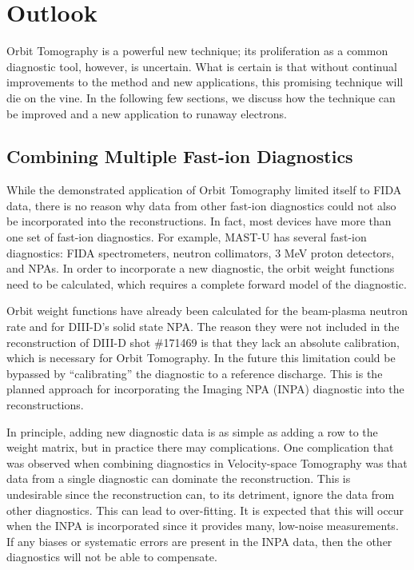 \chapter{Outlook}\label{chap:outlook}

Orbit Tomography is a powerful new technique; its proliferation as a common diagnostic tool, however, is uncertain. What is certain is that without continual improvements to the method and new applications, this promising technique will die on the vine. In the following few sections, we discuss how the technique can be improved and a new application to runaway electrons.

\section{Combining Multiple Fast-ion Diagnostics}
While the demonstrated application of Orbit Tomography limited itself to FIDA data, there is no reason why data from other fast-ion diagnostics could not also be incorporated into the reconstructions. In fact, most devices have more than one set of fast-ion diagnostics. For example, MAST-U has several fast-ion diagnostics: FIDA spectrometers, neutron collimators, 3 MeV proton detectors, and NPAs. In order to incorporate a new diagnostic, the orbit weight functions need to be calculated, which requires a complete forward model of the diagnostic.

Orbit weight functions have already been calculated for the beam-plasma neutron rate and for DIII-D's solid state NPA. The reason they were not included in the reconstruction of DIII-D shot \#171469 is that they lack an absolute calibration, which is necessary for Orbit Tomography. In the future this limitation could be bypassed by ``calibrating'' the diagnostic to a reference discharge. This is the planned approach for incorporating the Imaging NPA (INPA) diagnostic into the reconstructions.

In principle, adding new diagnostic data is as simple as adding a row to the weight matrix, but in practice there may complications. One complication that was observed when combining diagnostics in Velocity-space Tomography\cite{salewski2012,salewski2013_tomography,salewski2017mev,salewski2018bayesian} was that data from a single diagnostic can dominate the reconstruction. This is undesirable since the reconstruction can, to its detriment, ignore the data from other diagnostics. This can lead to over-fitting. It is expected that this will occur when the INPA is incorporated since it provides many, low-noise measurements. If any biases or systematic errors are present in the INPA data, then the other diagnostics will not be able to compensate.

